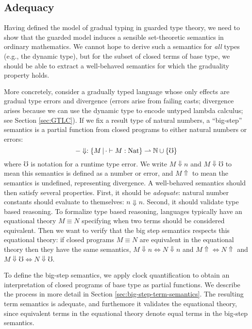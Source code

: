 \subsection{Adequacy}


Having defined the model of gradual typing in guarded type theory, we need to
show that the guarded model induces a sensible set-theoretic semantics in
ordinary mathematics. We cannot hope to derive such a semantics for \emph{all}
types (e.g., the dynamic type), but for the subset of closed terms of base type,
we should be able to extract a well-behaved semantics for which the graduality
property holds.

More concretely, consider a gradually typed language whose only effects are
gradual type errors and divergence (errors arise from failing casts; divergence
arises because we can use the dynamic type to encode untyped lambda calculus;
see Section \ref{sec:GTLC}). If we fix a result type of natural numbers, a
``big-step'' semantics is a partial function from closed programs to either natural
numbers or errors:
%
\[ -\Downarrow : \{M \,|\, \cdot \vdash M : \text{Nat} \} \rightharpoonup \mathbb{N}
\cup \{\mho\} \] 
%
where $\mho$ is notation for a runtime type error. We write $M \Downarrow n$ and
$M\Downarrow \mho$ to mean this semantics is defined as a number or error, and
$M\Uparrow$ to mean the semantics is undefined, representing divergence.
%
A well-behaved semantics should then satisfy several properties. First, it
should be \emph{adequate}: natural number constants should evaluate to
themselves: $n \Downarrow n$. Second, it should validate type based reasoning.
To formalize type based reasoning, languages typically have an equational theory
$M \equiv N$ specifying when two terms should be considered equivalent.
Then we want to verify that the big step semantics respects this equational
theory: if closed programs $M \equiv N$ are equivalent in the equational theory
then they have the same semantics, $M \Downarrow n \iff N \Downarrow n$ and
$M\Uparrow \iff N \Uparrow$ and $M \Downarrow \mho \iff N \Downarrow \mho$.

To define the big-step semantics, we apply clock quantification to obtain
an interpretation of closed programs of base type as partial functions.
We describe the process in more detail in Section
\ref{sec:big-step-term-semantics}. The resulting term semantics is adequate, and
furthemore it validates the equational theory, since equivalent terms in the
equational theory denote equal terms in the big-step semantics.

